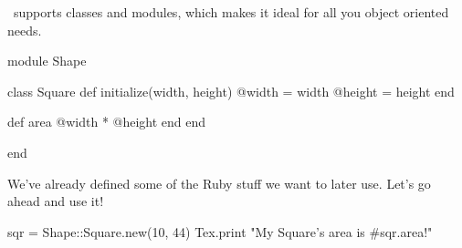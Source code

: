 \documentclass{article}
\begin{document}
\RbTeX\ supports classes and modules, which makes it ideal for all you object oriented needs.\\

\begin{rbtex}
module Shape

    class Square
        def initialize(width, height)
            @width = width
            @height = height
        end

        def area
            @width * @height
        end
    end

end
\end{rbtex}

We've already defined some of the Ruby stuff we want to later use. Let's go ahead and use it!

\begin{rbtex}
sqr = Shape::Square.new(10, 44)
Tex.print "My Square's area is #{sqr.area}!"
\end{rbtex}
\end{document}
